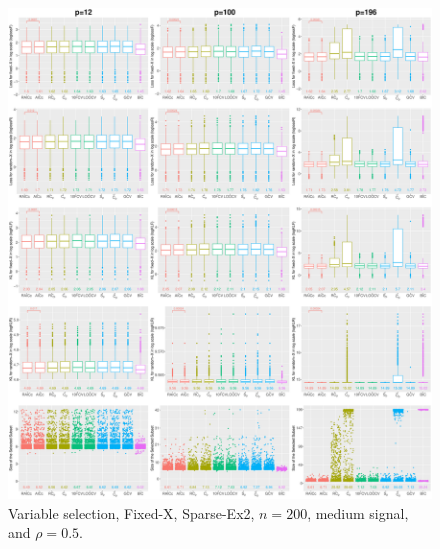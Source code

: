 \begin{figure}[!ht]
\centering
\includegraphics[width=\textwidth]{figures/supplement/fixedx/subset_selection/Sparse-Ex2_n200_msnr_rho05.eps}
\caption{Variable selection, Fixed-X, Sparse-Ex2, $n=200$, medium signal, and $\rho=0.5$.}
\end{figure}
\clearpage
